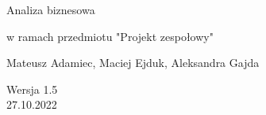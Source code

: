 \begin{titlepage}
   \begin{center}
        \vspace*{1cm}
        
        \huge
        Analiza biznesowa
        
        \small
        w ramach przedmiotu "Projekt zespołowy"
        
        \normalsize

        \vspace{0.5cm}
            
        \vspace{1.5cm}

        Mateusz Adamiec, Maciej Ejduk, Aleksandra Gajda\\

        \vfill
            
        \vspace{0.8cm}
            
        Wersja 1.5\\
        27.10.2022
            
   \end{center}
\end{titlepage}
